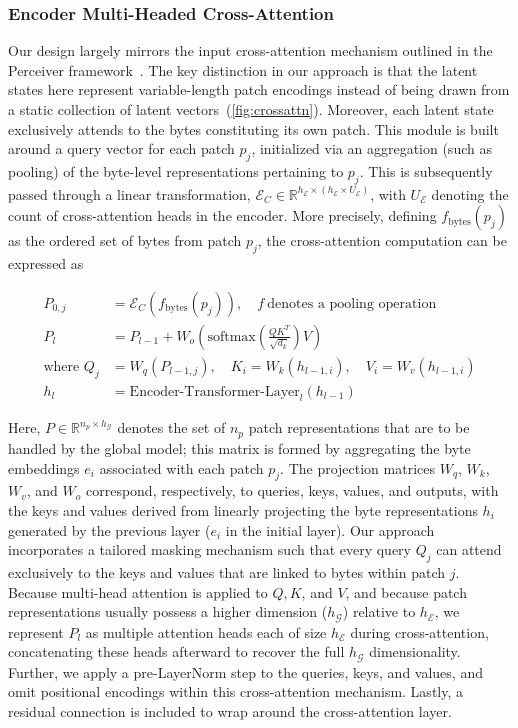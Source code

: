 \subsubsection{Encoder Multi-Headed Cross-Attention}
\label{sec:enc-cross-attn}
Our design largely mirrors the input cross-attention mechanism outlined in the Perceiver framework~\citep{jaegle2021perceiver}. The key distinction in our approach is that the latent states here represent variable-length patch encodings instead of being drawn from a static collection of latent vectors~(\autoref{fig:crossattn}). Moreover, each latent state exclusively attends to the bytes constituting its own patch. This module is built around a query vector for each patch $p_j$, initialized via an aggregation (such as pooling) of the byte-level representations pertaining to $p_j$. This is subsequently passed through a linear transformation, $\mathcal{E}_{C} \in \mathbb{R}^{h_{\mathcal{E}} \times (h_{\mathcal{E}} \times U_{\mathcal{E}})}$, with $U_{\mathcal{E}}$ denoting the count of cross-attention heads in the encoder. More precisely, defining $f_{\text{bytes}}(p_j)$ as the ordered set of bytes from patch $p_j$, the cross-attention computation can be expressed as

\begin{align}
P_{0,j} &= \mathcal{E}_{C}(f_\text{bytes}(p_j)), \quad f~ \text{denotes a pooling operation} \\
P_l &= P_{l-1} + W_o\left(\text{softmax}\left(\frac{QK^T}{\sqrt{d_k}}\right)V\right) \\
\text{where } Q_j &= W_q(P_{l-1,j}), \quad K_i = W_k(h_{l-1,i}), \quad V_i = W_v(h_{l-1,i}) \\
h_l &= \text{Encoder-Transformer-Layer}_l(h_{l-1})
\end{align}

Here, $P \in \mathbb{R}^{n_p \times h_{\mathcal{G}}}$ denotes the set of $n_p$ patch representations that are to be handled by the global model; this matrix is formed by aggregating the byte embeddings $e_i$ associated with each patch $p_j$. The projection matrices $W_q$, $W_k$, $W_v$, and $W_o$ correspond, respectively, to queries, keys, values, and outputs, with the keys and values derived from linearly projecting the byte representations $h_i$ generated by the previous layer ($e_i$ in the initial layer). Our approach incorporates a tailored masking mechanism such that every query $Q_j$ can attend exclusively to the keys and values that are linked to bytes within patch $j$. Because multi-head attention is applied to $Q, K$, and $V$, and because patch representations usually possess a higher dimension ($h_{\mathcal{G}}$) relative to $h_{\mathcal{E}}$, we represent $P_l$ as multiple attention heads each of size $h_{\mathcal{E}}$ during cross-attention, concatenating these heads afterward to recover the full $h_{\mathcal{G}}$ dimensionality. Further, we apply a pre-LayerNorm step to the queries, keys, and values, and omit positional encodings within this cross-attention mechanism. Lastly, a residual connection is included to wrap around the cross-attention layer.

